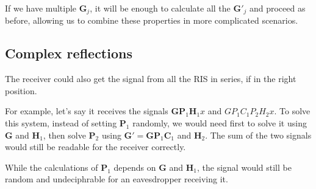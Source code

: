 If we have multiple $\bm{G}_j$, it will be enough to calculate all the $\bm{G}'_j$ and proceed as before, allowing us to combine these properties in more complicated scenarios.

\subsection{Complex reflections}

The receiver could also get the signal from all the RIS in series, if in the right position.

For example, let's say it receives the signals $\bm{GP}_1\bm{H}_1x$ and $GP_1C_1P_2H_2x$. To solve this system, instead of setting $\bm{P}_1$ randomly, we would need first to solve it using $\bm{G}$ and $\bm{H}_1$, then solve $\bm{P}_2$ using $\bm{G}'=\bm{GP}_1\bm{C}_1$ and $\bm{H}_2$. The sum of the two signals would still be readable for the receiver correctly.

While the calculations of $\bm{P}_1$ depends on $\bm{G}$ and $\bm{H}_1$, the signal would still be random and undeciphrable for an eavesdropper receiving it.
